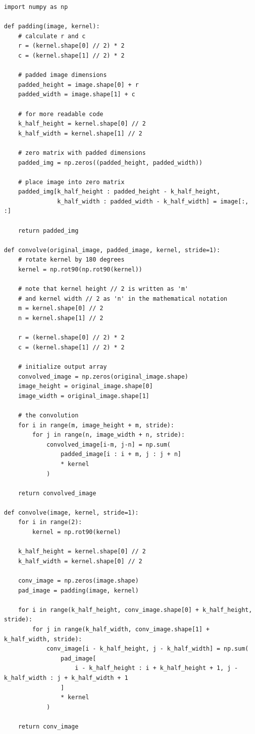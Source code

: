 \documentclass[%
oneside,                 %
final,                   %
10pt]{article}
\begin{document}
\begin{verbatim}
import numpy as np

def padding(image, kernel):
    # calculate r and c
    r = (kernel.shape[0] // 2) * 2
    c = (kernel.shape[1] // 2) * 2
    
    # padded image dimensions
    padded_height = image.shape[0] + r
    padded_width = image.shape[1] + c
    
    # for more readable code
    k_half_height = kernel.shape[0] // 2
    k_half_width = kernel.shape[1] // 2

    # zero matrix with padded dimensions
    padded_img = np.zeros((padded_height, padded_width))

    # place image into zero matrix
    padded_img[k_half_height : padded_height - k_half_height,
               k_half_width : padded_width - k_half_width] = image[:, :]

    return padded_img

def convolve(original_image, padded_image, kernel, stride=1):
    # rotate kernel by 180 degrees
    kernel = np.rot90(np.rot90(kernel))

    # note that kernel height // 2 is written as 'm'
    # and kernel width // 2 as 'n' in the mathematical notation
    m = kernel.shape[0] // 2
    n = kernel.shape[1] // 2
    
    r = (kernel.shape[0] // 2) * 2
    c = (kernel.shape[1] // 2) * 2
    
    # initialize output array
    convolved_image = np.zeros(original_image.shape)
    image_height = original_image.shape[0]
    image_width = original_image.shape[1]

    # the convolution
    for i in range(m, image_height + m, stride):
        for j in range(n, image_width + n, stride):
            convolved_image[i-m, j-n] = np.sum(
                padded_image[i : i + m, j : j + n]
                * kernel
            )
            
    return convolved_image

def convolve(image, kernel, stride=1):
    for i in range(2):
        kernel = np.rot90(kernel)

    k_half_height = kernel.shape[0] // 2
    k_half_width = kernel.shape[0] // 2

    conv_image = np.zeros(image.shape)
    pad_image = padding(image, kernel)

    for i in range(k_half_height, conv_image.shape[0] + k_half_height, stride):
        for j in range(k_half_width, conv_image.shape[1] + k_half_width, stride):
            conv_image[i - k_half_height, j - k_half_width] = np.sum(
                pad_image[
                    i - k_half_height : i + k_half_height + 1, j - k_half_width : j + k_half_width + 1
                ]
                * kernel
            )

    return conv_image

\end{verbatim}
\end{document}

